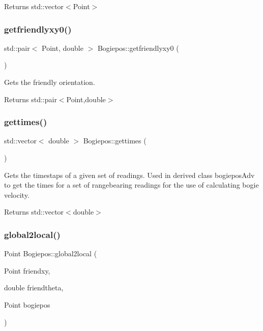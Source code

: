 \begin{DoxyReturn}{Returns}
std\+::vector$<$\+Point$>$ 
\end{DoxyReturn}
\mbox{\label{classBogiepos_a8bdb83f90cf5381b9c620a7fbc12a2dc}} 
\subsubsection{\texorpdfstring{getfriendlyxy0()}{getfriendlyxy0()}}
{\footnotesize\ttfamily std\+::pair$<$ Point, double $>$ Bogiepos\+::getfriendlyxy0 (\begin{DoxyParamCaption}{ }\end{DoxyParamCaption})}



Gets the friendly orientation. 

\begin{DoxyReturn}{Returns}
std\+::pair$<$\+Point,double$>$ 
\end{DoxyReturn}
\mbox{\label{classBogiepos_a349025535b13e08322a94409e57873e9}} 
\subsubsection{\texorpdfstring{gettimes()}{gettimes()}}
{\footnotesize\ttfamily std\+::vector$<$ double $>$ Bogiepos\+::gettimes (\begin{DoxyParamCaption}{ }\end{DoxyParamCaption})\hspace{0.3cm}{\ttfamily [protected]}}



Gets the timestaps of a given set of readings. Used in derived class bogiepos\+Adv to get the times for a set of rangebearing readings for the use of calculating bogie velocity. 

\begin{DoxyReturn}{Returns}
std\+::vector$<$double$>$ 
\end{DoxyReturn}
\mbox{\label{classBogiepos_a91b69776c48fd215112e60e7f6cc55fa}} 
\subsubsection{\texorpdfstring{global2local()}{global2local()}}
{\footnotesize\ttfamily Point Bogiepos\+::global2local (\begin{DoxyParamCaption}\item[{Point}]{friendxy,  }\item[{double}]{friendtheta,  }\item[{Point}]{bogiepos }\end{DoxyParamCaption})}



